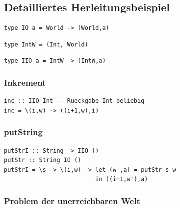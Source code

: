 


	\newpage
	\subsection{Detailliertes Herleitungsbeispiel} %
	\label{sub:detailliertes_herleitungsbeispiel}
	
		\begin{lstlisting}
type IO a = World -> (World,a)
		\end{lstlisting}

		\begin{lstlisting}
type IntW = (Int, World)
		\end{lstlisting}

		\begin{lstlisting}
type IIO a = IntW -> (IntW,a)
		\end{lstlisting}

		\subsubsection{Inkrement} %
		\label{ssub:inkrement}
		
			\lstHaskell
			\begin{lstlisting}
inc :: IIO Int -- Rueckgabe Int beliebig
inc = \(i,w) -> ((i+1,w),i)
			\end{lstlisting}


		\subsubsection{putString} %
		\label{ssub:putstring}
		
			\lstHaskell
			\begin{lstlisting}
putStrI :: String -> IIO ()
putStr :: String IO ()
putStrI = \s -> \(i,w) -> let (w',a) = putStr s w
                          in ((i+1,w'),a)
			\end{lstlisting}


		\subsubsection{Problem der unerreichbaren Welt} %
		\label{ssub:problem_der_unerreichbaren_welt}

